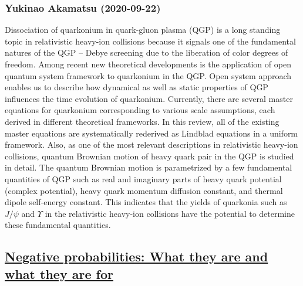 {\subsubsection*{Yukinao Akamatsu (2020-09-22)}
Dissociation of quarkonium in quark-gluon plasma (QGP) is a long standing
topic in relativistic heavy-ion collisions because it signals one of the
fundamental natures of the QGP -- Debye screening due to the liberation of
color degrees of freedom. Among recent new theoretical developments is the
application of open quantum system framework to quarkonium in the QGP. Open
system approach enables us to describe how dynamical as well as static
properties of QGP influences the time evolution of quarkonium.
  Currently, there are several master equations for quarkonium corresponding to
various scale assumptions, each derived in different theoretical frameworks. In
this review, all of the existing master equations are systematically rederived
as Lindblad equations in a uniform framework. Also, as one of the most relevant
descriptions in relativistic heavy-ion collisions, quantum Brownian motion of
heavy quark pair in the QGP is studied in detail. The quantum Brownian motion
is parametrized by a few fundamental quantities of QGP such as real and
imaginary parts of heavy quark potential (complex potential), heavy quark
momentum diffusion constant, and thermal dipole self-energy constant. This
indicates that the yields of quarkonia such as $J/\psi$ and $\Upsilon$ in the
relativistic heavy-ion collisions have the potential to determine these
fundamental quantities.

\subsection*{\href{http://arxiv.org/abs/2009.10552v1}{Negative probabilities: What they are and what they are for}}
}
